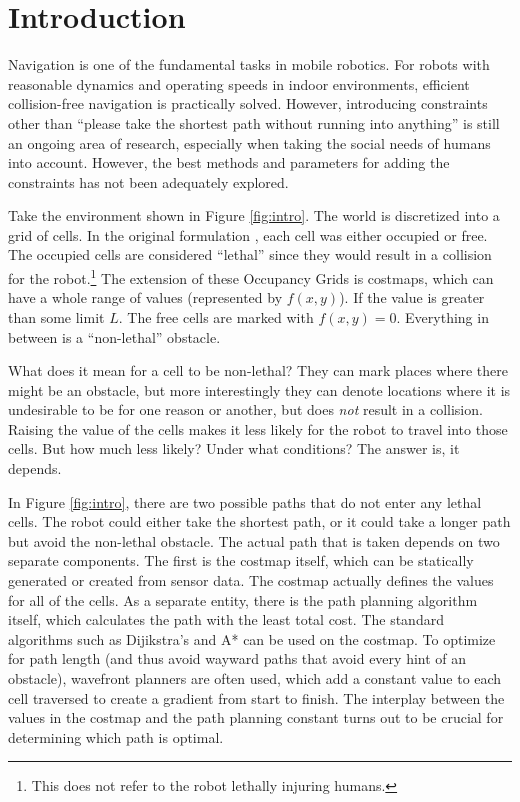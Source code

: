 \section{Introduction}
Navigation is one of the fundamental tasks in mobile robotics. For robots with reasonable dynamics and operating speeds in indoor environments, efficient collision-free navigation is practically solved. However, introducing constraints other than ``please take the shortest path without running into anything'' is still an ongoing area of research, especially when taking the social needs of humans into account. However, the best methods and parameters for adding the constraints has not been adequately explored. 

Take the environment shown in Figure \ref{fig:intro}. The world is discretized into a grid of cells. In the original formulation \cite{matthies1988}, each cell was either occupied or free. The occupied cells are considered ``lethal'' since they would result in a collision for the robot.\footnote{This does not refer to the robot lethally injuring humans.} The extension of these Occupancy Grids is costmaps, which can have a whole range of values (represented by $f(x,y)$). If the value is greater than some limit $L$. The free cells are marked with $f(x,y)=0$. Everything in between is a ``non-lethal'' obstacle. 

What does it mean for a cell to be non-lethal? They can mark places where there might be an obstacle, but more interestingly they can denote locations where it is undesirable to be for one reason or another, but does \emph{not} result in a collision. Raising the value of the cells makes it less likely for the robot to travel into those cells. But how much less likely? Under what conditions? The answer is, it depends. 

In Figure \ref{fig:intro}, there are two possible paths that do not enter any lethal cells.  The robot could either take the shortest path, or it could take a longer path but avoid the non-lethal obstacle. The actual path that is taken depends on two separate components. The first is the costmap itself, which can be statically generated or created from sensor data. The costmap actually defines the values for all of the cells. As a separate entity, there is the path planning algorithm itself, which calculates the path with the least total cost. The standard algorithms such as Dijikstra's and A* can be used on the costmap. To optimize for path length (and thus avoid wayward paths that avoid every hint of an obstacle), wavefront planners are often used, which add a constant value to each cell traversed to create a gradient from start to finish\cite{choset:principles}. The interplay between the values in the costmap and the path planning constant turns out to be crucial for determining which path is optimal. 


